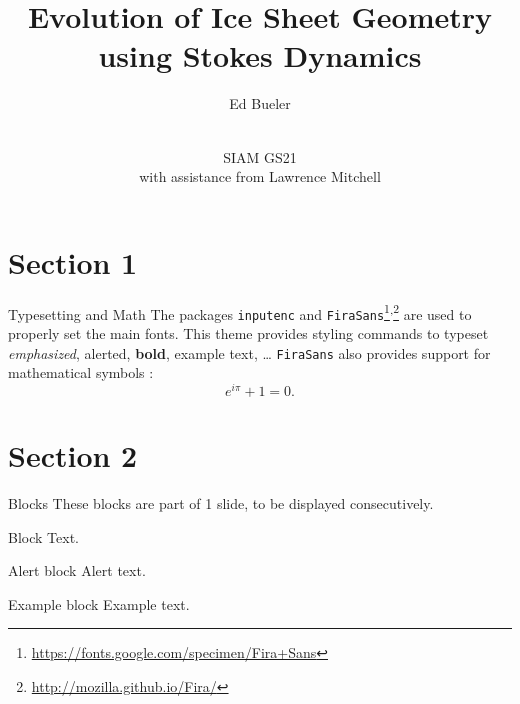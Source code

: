 \documentclass{beamer}
\title{Evolution of Ice Sheet Geometry using Stokes Dynamics}
\author{Ed Bueler}
\institute{University of Alaska Fairbanks}
\date{\phantom{foo} \bigskip \bigskip \\ SIAM GS21 \\ with assistance from Lawrence Mitchell}
\begin{document}
\begin{frame}
	\maketitle
\end{frame}

\begin{frame}
	\tableofcontents
\end{frame}


\section{Section 1}

\begin{frame}{Typesetting and Math}
	The packages \texttt{inputenc} and \texttt{FiraSans}\footnote{\url{https://fonts.google.com/specimen/Fira+Sans}}\textsuperscript{,}\footnote{\url{http://mozilla.github.io/Fira/}} are used to properly set the main fonts.
	\vfill
	This theme provides styling commands to typeset \emph{emphasized}, \alert{alerted}, \textbf{bold}, \textcolor{example}{example text}, \dots
	\vfill
	\texttt{FiraSans} also provides support for mathematical symbols \cite{Bueler2021conservation}:
	\begin{equation*}
		e^{i\pi} + 1 = 0.
	\end{equation*}
\end{frame}


\section{Section 2}


\begin{frame}{Blocks}
	These blocks are part of 1 slide, to be displayed consecutively.
	\begin{block}{Block}
		Text.
	\end{block}
	\pause %
	\begin{alertblock}{Alert block}
		Alert \alert{text}.
	\end{alertblock}
	\pause %
	\begin{exampleblock}{Example block}
		Example \textcolor{example}{text}.
	\end{exampleblock}
\end{frame}
\end{document}
